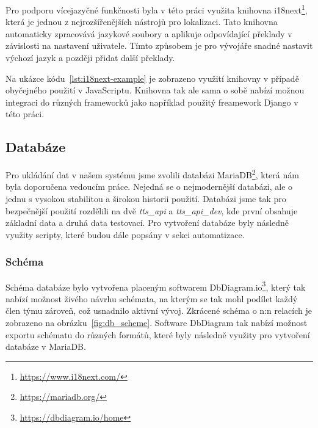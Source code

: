 Pro podporu vícejazyčné funkčnosti byla v této práci využita knihovna i18next\footnote{\href{https://www.i18next.com/}{https://www.i18next.com/}}, která je jednou z nejrozšířenějších nástrojů pro lokalizaci. Tato knihovna automaticky zpracovává jazykové soubory a aplikuje odpovídající překlady v závislosti na nastavení uživatele. Tímto způsobem je pro vývojáře snadné nastavit výchozí jazyk a později přidat další překlady.



Na ukázce kódu~\ref{lst:i18next-example} je zobrazeno využití knihovny v případě obyčejného použití v JavaScriptu. Knihovna tak ale sama o sobě nabízí možnou integraci do různých frameworků jako například použitý freamework Django v této práci.

\subsection{Databáze}
\label{subsec:implementation-technologies-database}
Pro ukládání dat v našem systému jsme zvolili databázi MariaDB\footnote{\href{https://mariadb.org/}{https://mariadb.org/}}, která nám byla doporučena vedoucím práce. Nejedná se o nejmodernější databázi, ale o jednu s vysokou stabilitou a širokou historii použití. Databázi jsme tak pro bezpečnější použití rozdělili na dvě \textit{tts\_api} a \textit{tts\_api\_dev}, kde první obsahuje základní data a druhá data testovací. Pro vytvoření databáze byly následně využity scripty, které budou dále popsány v sekci automatizace.

\subsubsection*{Schéma}
\label{subsubsec:implementation-technologies-database-scheme}
Schéma databáze bylo vytvořena placeným softwarem DbDiagram.io\footnote{\href{https://dbdiagram.io/home}{https://dbdiagram.io/home}}, který tak nabízí možnost živého návrhu schémata, na kterým se tak mohl podílet každý člen týmu zároveň, což usnadnilo aktivní vývoj. Zkrácené schéma o n:n relacích je zobrazeno na obrázku~\ref{fig:db_scheme}. Software DbDiagram tak nabízí možnost exportu schématu do různých formátů, které byly následně využity pro vytvoření databáze v MariaDB\@.

